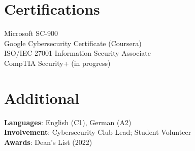 \documentclass[letterpaper,11pt]{article}
\begin{document}
\section{Certifications}
\begin{itemize}[leftmargin=0.15in, label={}]
    \small{\item{
      Microsoft SC-900 \\
      Google Cybersecurity Certificate (Coursera) \\
      ISO/IEC 27001 Information Security Associate \\
      CompTIA Security+ (in progress)
    }}
\end{itemize}

\section{Additional}
\begin{itemize}[leftmargin=0.15in, label={}]
    \small{\item{
      \textbf{Languages}{: English (C1), German (A2)} \\
      \textbf{Involvement}{: Cybersecurity Club Lead; Student Volunteer} \\
      \textbf{Awards}{: Dean's List (2022)}
    }}
\end{itemize}

\end{document}

